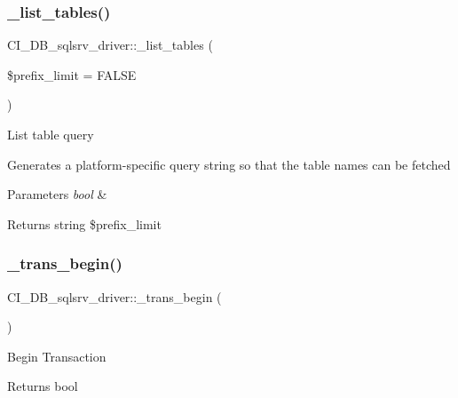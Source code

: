 \subsubsection{\texorpdfstring{\+\_\+list\+\_\+tables()}{\_list\_tables()}}
{\footnotesize\ttfamily C\+I\+\_\+\+D\+B\+\_\+sqlsrv\+\_\+driver\+::\+\_\+list\+\_\+tables (\begin{DoxyParamCaption}\item[{}]{\$prefix\+\_\+limit = {\ttfamily FALSE} }\end{DoxyParamCaption})\hspace{0.3cm}{\ttfamily [protected]}}

List table query

Generates a platform-\/specific query string so that the table names can be fetched


\begin{DoxyParams}{Parameters}
{\em bool} & \\
\hline
\end{DoxyParams}
\begin{DoxyReturn}{Returns}
string \$prefix\+\_\+limit 
\end{DoxyReturn}
\mbox{\label{class_c_i___d_b__sqlsrv__driver_a713f75fcd91fc14da1b43f375c2c0105}} 
\subsubsection{\texorpdfstring{\+\_\+trans\+\_\+begin()}{\_trans\_begin()}}
{\footnotesize\ttfamily C\+I\+\_\+\+D\+B\+\_\+sqlsrv\+\_\+driver\+::\+\_\+trans\+\_\+begin (\begin{DoxyParamCaption}{ }\end{DoxyParamCaption})\hspace{0.3cm}{\ttfamily [protected]}}

Begin Transaction

\begin{DoxyReturn}{Returns}
bool 
\end{DoxyReturn}
\mbox{\label{class_c_i___d_b__sqlsrv__driver_ae447ca34cd0deb2b1390531ca683848e}} 
